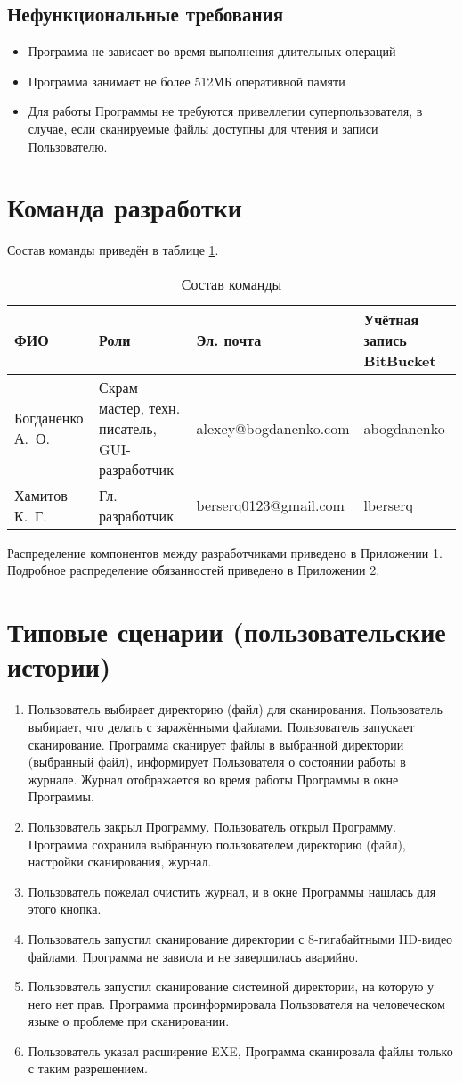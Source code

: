 \subsection{Нефункциональные требования}
\begin{itemize}
\item Программа не зависает во время выполнения длительных операций
\item Программа занимает не более 512МБ оперативной памяти
\item Для работы Программы не требуются привеллегии суперпользователя, в случае, если сканируемые файлы доступны для чтения и записи Пользователю.
\end{itemize}
\section{Команда разработки}
Состав команды приведён в таблице \ref{table:team}.
\begin{table}[h]
\centering
\begin{tabular}{|p{25mm}|p{35mm}|l|p{25mm}|}
\hline
ФИО & Роли & Эл. почта & Учётная запись BitBucket \\
\hline
Богданенко А.~О. & Скрам-мастер, техн. писатель, GUI-разработчик & alexey@bogdanenko.com & abogdanenko \\
\hline
Хамитов К.~Г. & Гл. разработчик & berserq0123@gmail.com & lberserq \\
\hline
\end{tabular}
\caption{Состав команды}
\label{table:team}
\end{table}
Распределение компонентов между разработчиками приведено в Приложении 1. Подробное распределение обязанностей приведено в Приложении 2.
\section{Типовые сценарии (пользовательские истории)}
\begin{enumerate}
\item Пользователь выбирает директорию (файл) для сканирования. Пользователь выбирает, что делать с заражёнными файлами. Пользователь запускает сканирование. Программа сканирует файлы в выбранной директории (выбранный файл), информирует Пользователя о состоянии работы в журнале. Журнал отображается во время работы Программы в окне Программы.
\item Пользователь закрыл Программу. Пользователь открыл Программу. Программа сохранила выбранную пользователем директорию (файл), настройки сканирования, журнал.
\item Пользователь пожелал очистить журнал, и в окне Программы нашлась для этого кнопка.
\item Пользователь запустил сканирование директории с 8-гигабайтными HD-видео файлами. Программа не зависла и не завершилась аварийно.
\item Пользователь запустил сканирование системной директории, на которую у него нет прав. Программа проинформировала Пользователя на человеческом языке о проблеме при сканировании.
\item Пользователь указал расширение EXE, Программа сканировала файлы только с таким разрешением.
\end{enumerate}
